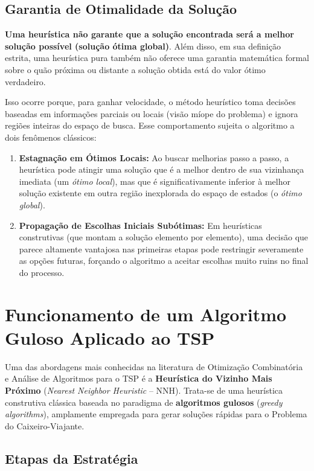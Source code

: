 \subsection{Garantia de Otimalidade da Solução}

\textbf{Uma heurística não garante que a solução encontrada será a melhor solução possível (solução ótima global)}. Além disso, em sua definição estrita, uma heurística pura também não oferece uma garantia matemática formal sobre o quão próxima ou distante a solução obtida está do valor ótimo verdadeiro.

Isso ocorre porque, para ganhar velocidade, o método heurístico toma decisões baseadas em informações parciais ou locais (visão míope do problema) e ignora regiões inteiras do espaço de busca. Esse comportamento sujeita o algoritmo a dois fenômenos clássicos:

\begin{enumerate}
    \item \textbf{Estagnação em Ótimos Locais:} Ao buscar melhorias passo a passo, a heurística pode atingir uma solução que é a melhor dentro de sua vizinhança imediata (um \textit{ótimo local}), mas que é significativamente inferior à melhor solução existente em outra região inexplorada do espaço de estados (o \textit{ótimo global}).
    \item \textbf{Propagação de Escolhas Iniciais Subótimas:} Em heurísticas construtivas (que montam a solução elemento por elemento), uma decisão que parece altamente vantajosa nas primeiras etapas pode restringir severamente as opções futuras, forçando o algoritmo a aceitar escolhas muito ruins no final do processo.
\end{enumerate}

\section{Funcionamento de um Algoritmo Guloso Aplicado ao TSP}

Uma das abordagens mais conhecidas na literatura de Otimização Combinatória e Análise de Algoritmos para o TSP é a \textbf{Heurística do Vizinho Mais Próximo} (\textit{Nearest Neighbor Heuristic} -- NNH). Trata-se de uma heurística construtiva clássica baseada no paradigma de \textbf{algoritmos gulosos} (\textit{greedy algorithms}), amplamente empregada para gerar soluções rápidas para o Problema do Caixeiro-Viajante.

\subsection{Etapas da Estratégia}


